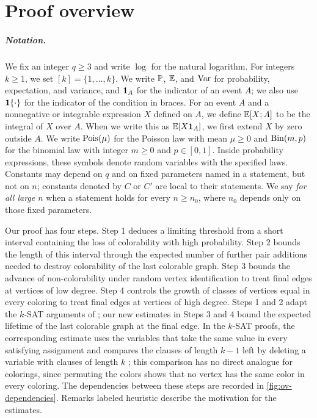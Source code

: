 \chapter{Proof overview}\label{sec:overview}

\paragraph{Notation.}\label{sec:ov-notation}
We fix an integer $q \ge 3$ and write $\log$ for the natural logarithm. For integers $k \ge 1$, we set $[k] = \{1, \dots, k\}$. We write $\mathbb P$, $\mathbb E$, and $\operatorname{Var}$ for probability, expectation, and variance, and $\mathbf 1_A$ for the indicator of an event $A$; we also use $\mathbf 1\{ \cdot \}$ for the indicator of the condition in braces. For an event $A$ and a nonnegative or integrable expression $X$ defined on $A$, we define $\mathbb E[X; A]$ to be the integral of $X$ over $A$. When we write this as $\mathbb E[X\mathbf 1_A]$, we first extend $X$ by zero outside $A$. We write $\operatorname{Pois}(\mu)$ for the Poisson law with mean $\mu \ge 0$ and $\operatorname{Bin}(m, p)$ for the binomial law with integer $m \ge 0$ and $p \in [0, 1]$. Inside probability expressions, these symbols denote random variables with the specified laws. Constants may depend on $q$ and on fixed parameters named in a statement, but not on $n$; constants denoted by $C$ or $C'$ are local to their statements. We say \emph{for all large $n$} when a statement holds for every $n \ge n_0$, where $n_0$ depends only on those fixed parameters.

Our proof has four steps. Step 1 deduces a limiting threshold from a short interval containing the loss of colorability with high probability. Step 2 bounds the length of this interval through the expected number of further pair additions needed to destroy colorability of the last colorable graph. Step 3 bounds the advance of non-colorability under random vertex identification to treat final edges at vertices of low degree. Step 4 controls the growth of classes of vertices equal in every coloring to treat final edges at vertices of high degree. Steps 1 and 2 adapt the $k$-SAT arguments of \cite{carenini2026polynomial,openai2026limiting}; our new estimates in Steps 3 and 4 bound the expected lifetime of the last colorable graph at the final edge. In the $k$-SAT proofs, the corresponding estimate uses the variables that take the same value in every satisfying assignment and compares the clauses of length $k - 1$ left by deleting a variable with clauses of length $k$ \cite{carenini2026polynomial,openai2026limiting,openai2026variance}; this comparison has no direct analogue for colorings, since permuting the colors shows that no vertex has the same color in every coloring. The dependencies between these steps are recorded in \cref{fig:ov-dependencies}. Remarks labeled heuristic describe the motivation for the estimates.

